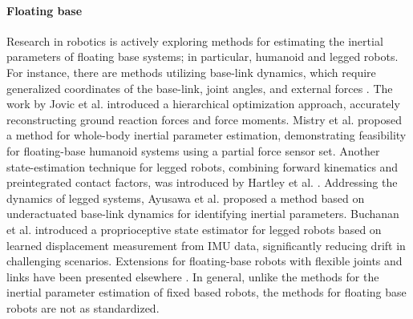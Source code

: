 \paragraph*{Floating base} Research in robotics is actively exploring methods for estimating the inertial parameters of floating base systems; in particular, humanoid and legged robots. For instance, there are methods utilizing base-link dynamics, which require generalized coordinates of the base-link, joint angles, and external forces \cite{Ayusawa2008Identificationhumanoidrobots, Ayusawa2008Identificationinertialparameters, Ayusawa2009MinimalsetInertial, Iwasaki2012Identificationinertialparameters}. The work by Jovic et al. \cite{Jovic2016HumanoidHumanInertia} introduced a hierarchical optimization approach, accurately reconstructing ground reaction forces and force moments. Mistry et al. \cite{Mistry2009Inertialparameterestimation} proposed a method for whole-body inertial parameter estimation, demonstrating feasibility for floating-base humanoid systems using a partial force sensor set. Another state-estimation technique for legged robots, combining forward kinematics and preintegrated contact factors, was introduced by Hartley et al. \cite{Hartley2018LeggedRobotState}. Addressing the dynamics of legged systems, Ayusawa et al. \cite{Ayusawa2014Identifiabilityidentificationinertial} proposed a method based on underactuated base-link dynamics for identifying inertial parameters. Buchanan et al. \cite{RussellBuchanan2021LearningInertialOdometry} introduced a proprioceptive state estimator for legged robots based on learned displacement measurement from IMU data, significantly reducing drift in challenging scenarios. Extensions for floating-base robots with flexible joints and links have been presented elsewhere \cite{Khalil2017GeneralDynamicAlgorithm}. In general, unlike the methods for the inertial parameter estimation of fixed based robots, the methods for floating base robots are not as standardized.

